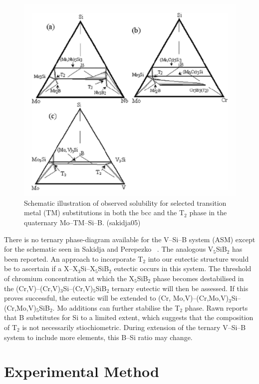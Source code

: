 \begin{figure}[H]
\begin{center}
\includegraphics{T2_alloying}
\caption{Schematic illustration of observed solubility for selected transition metal (TM) substitutions in both the bcc and the T$_2$ phase in the quaternary Mo--TM--Si--B. (sakidja05)}\label{fig:T2_alloying}
\end{center}
\end{figure}
%
There is no ternary phase-diagram available for the V--Si--B system (ASM) except for the schematic seen in Sakidja and Perepezko ~\cite{sakidja05}. The analogous V$_5$SiB$_2$ has been reported. An approach to incorporate T$_2$ into our eutectic structure would be to ascertain if a X--X$_3$Si--X$_5$SiB$_2$ eutectic occurs in this system. The threshold of chromium concentration at which the X$_5$SiB$_2$ phase becomes destabilised in the (Cr,V)--(Cr,V)$_3$Si--(Cr,V)$_5$SiB$_2$ ternary eutectic will then be assessed. If this proves successful, the eutectic will be extended to (Cr, Mo,V)--(Cr,Mo,V)$_3$Si--(Cr,Mo,V)$_5$SiB$_2$. Mo additions can further stabilise the T$_2$ phase. Rawn reports that B substitutes for Si to a limited extent, which suggests that the composition of T$_2$ is not necessarily stiochiometric. During extension of the ternary V--Si--B system to include more elements, this B--Si ratio may change.

\section{Experimental Method}
